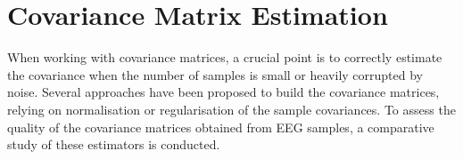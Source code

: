 
\section{Covariance Matrix Estimation}
\label{sec:covmat-estimation}

When working with covariance matrices, a crucial point is to correctly estimate the covariance when the number of samples is small or heavily corrupted by noise. 
Several approaches have been proposed to build the covariance matrices, relying on normalisation or regularisation of the sample covariances. 
To assess the quality of the covariance matrices obtained from EEG samples, a comparative study of these estimators is conducted.

